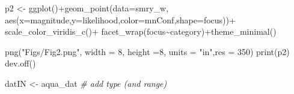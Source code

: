 \documentclass[
]{article}
\newenvironment{Shaded}{\begin{snugshade}}{\end{snugshade}}
\newcommand{\AttributeTok}[1]{\textcolor[rgb]{0.77,0.63,0.00}{#1}}
\newcommand{\CommentTok}[1]{\textcolor[rgb]{0.56,0.35,0.01}{\textit{#1}}}
\newcommand{\DecValTok}[1]{\textcolor[rgb]{0.00,0.00,0.81}{#1}}
\newcommand{\FunctionTok}[1]{\textcolor[rgb]{0.00,0.00,0.00}{#1}}
\newcommand{\NormalTok}[1]{#1}
\newcommand{\OtherTok}[1]{\textcolor[rgb]{0.56,0.35,0.01}{#1}}
\newcommand{\SpecialCharTok}[1]{\textcolor[rgb]{0.00,0.00,0.00}{#1}}
\newcommand{\StringTok}[1]{\textcolor[rgb]{0.31,0.60,0.02}{#1}}
\begin{document}
\begin{Shaded}
\begin{Highlighting}[]
\NormalTok{  p2 }\OtherTok{\textless{}{-}} \FunctionTok{ggplot}\NormalTok{()}\SpecialCharTok{+}\FunctionTok{geom\_point}\NormalTok{(}\AttributeTok{data=}\NormalTok{smry\_w,}
                            \FunctionTok{aes}\NormalTok{(}\AttributeTok{x=}\NormalTok{magnitude,}\AttributeTok{y=}\NormalTok{likelihood,}\AttributeTok{color=}\NormalTok{mnConf,}\AttributeTok{shape=}\NormalTok{focus))}\SpecialCharTok{+}
      \FunctionTok{scale\_color\_viridis\_c}\NormalTok{()}\SpecialCharTok{+}
      \FunctionTok{facet\_wrap}\NormalTok{(focus}\SpecialCharTok{\textasciitilde{}}\NormalTok{category)}\SpecialCharTok{+}\FunctionTok{theme\_minimal}\NormalTok{()}
       
    \FunctionTok{png}\NormalTok{(}\StringTok{"Figs/Fig2.png"}\NormalTok{, }\AttributeTok{width =} \DecValTok{8}\NormalTok{, }\AttributeTok{height =}\DecValTok{8}\NormalTok{, }\AttributeTok{units =} \StringTok{"in"}\NormalTok{,}\AttributeTok{res =} \DecValTok{350}\NormalTok{)}
    \FunctionTok{print}\NormalTok{(p2)}
    \FunctionTok{dev.off}\NormalTok{()}
   
\NormalTok{    datIN      }\OtherTok{\textless{}{-}}\NormalTok{ aqua\_dat}
   \CommentTok{\# add type (and range)}
\end{Highlighting}
\end{Shaded}
\end{document}

